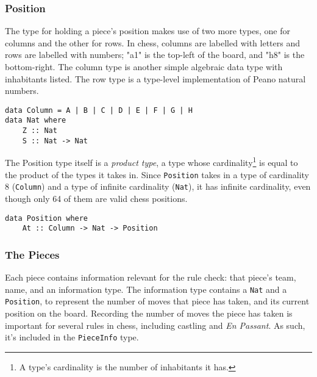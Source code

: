 \documentclass[12pt, a4paper]{scrartcl}
\begin{document}
\subsubsection{Position}

The type for holding a piece's position makes use of two more types, one for columns and the other for rows. In chess, columns are labelled with letters and rows are labelled with numbers; "a1" is the top-left of the board, and "h8" is the bottom-right. The column type is another simple algebraic data type with inhabitants listed. The row type is a type-level implementation of Peano natural numbers.


\begin{lstlisting}
data Column = A | B | C | D | E | F | G | H
data Nat where
    Z :: Nat
    S :: Nat -> Nat
\end{lstlisting}

The Position type itself is a \emph{product type}, a type whose cardinality\footnote{A type's cardinality is the number of inhabitants it has.} is equal to the product of the types it takes in. Since \lstinline{Position} takes in a type of cardinality 8 (\lstinline{Column}) and a type of infinite cardinality (\lstinline{Nat}), it has infinite cardinality, even though only 64 of them are valid chess positions.


\begin{lstlisting}
data Position where
    At :: Column -> Nat -> Position
\end{lstlisting}

\subsubsection{The Pieces}

Each piece contains information relevant for the rule check: that piece's team, name, and an information type. The information type contains a \lstinline{Nat} and a \lstinline{Position}, to represent the number of moves that piece has taken, and its current position on the board. Recording the number of moves the piece has taken is important for several rules in chess, including castling and \textit{En Passant}. As such, it's included in the \lstinline{PieceInfo} type.
\end{document}
